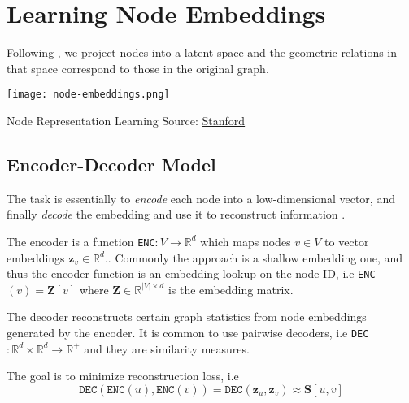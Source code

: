 \section{Learning Node Embeddings}
Following \cite{node-emb-latent-space}, we project nodes into a latent space and the geometric relations in that space correspond to those in the original graph.
\begin{marginfigure}
	\texttt{[image: node-embeddings.png]}
	\caption{Node Representation Learning Source: \href{https://snap-stanford.github.io/cs224w-notes/machine-learning-with-networks/node-representation-learning}{Stanford}}
	\label{fig:node-embedding}
\end{marginfigure}
\subsection{Encoder-Decoder Model}
The task is essentially to \textit{encode} each node into a low-dimensional vector, and finally \textit{decode} the embedding and use it to reconstruct information \cite{representation-learning-methods}.
\begin{definition}[Encoder]
The encoder is a function \texttt{ENC}$:V \to \mathbb{R}^d$ which maps nodes $v \in V$ to vector embeddings $\mathbf{z}_v \in \mathbb{R}^d$.. Commonly the approach is a shallow embedding one, and thus the encoder function is an embedding lookup on the node ID, i.e \texttt{ENC}$(v) = \mathbf{Z}[v]$ where $\mathbf{Z} \in \mathbb{R}^{|V| \times d}$ is the embedding matrix.
\end{definition}
\begin{definition}[Decoder]
The decoder reconstructs certain graph statistics from node embeddings generated by the encoder. It is common to use pairwise decoders, i.e \texttt{DEC}$:\mathbb{R}^d \times \mathbb{R}^d \to \mathbb{R}^+$ and they are similarity measures.
\end{definition}
The goal is to minimize reconstruction loss, i.e 
\begin{equation}\label{eq:recon-loss}
\texttt{DEC}(\texttt{ENC}(u), \texttt{ENC}(v)) = \texttt{DEC}(\mathbf{z}_u, \mathbf{z}_v) \approx \mathbf{S}[u, v]
\end{equation}

